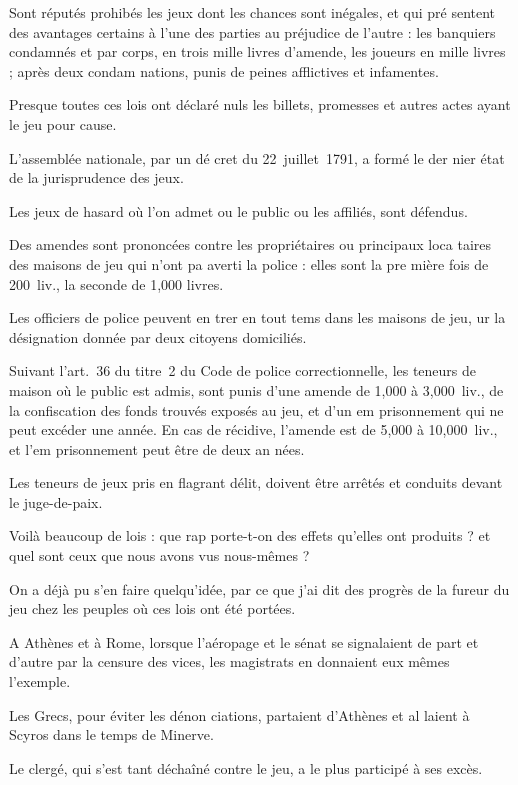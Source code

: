 Sont réputés prohibés les jeux dont
les chances sont inégales, et qui pré%
sentent des avantages certains à l'une
des parties au préjudice de l'autre : les
banquiers condamnés et par corps, en
trois mille livres d'amende, les joueurs
en mille livres ; après deux condam%
nations, punis de peines afflictives
et infamentes.

Presque toutes ces lois ont déclaré
nuls les billets, promesses et autres
actes ayant le jeu pour cause.

L'assemblée nationale, par un dé%
cret du 22~juillet~1791, a formé le der%
nier état de la jurisprudence des jeux.

Les jeux de hasard où l'on admet ou
le public ou les affiliés, sont défendus.

Des amendes sont prononcées contre
les propriétaires ou principaux loca%
taires des maisons de jeu qui n'ont
pa averti la police : elles sont la pre%
mière fois de 200~liv., la seconde de 
1,000 livres.

Les officiers de police peuvent en%
trer en tout tems dans les maisons de
jeu, ur la désignation donnée par
deux citoyens domiciliés.

Suivant l'art.~36 du titre~2 du Code
de police correctionnelle, les teneurs
de maison où le public est admis,
sont punis d'une amende de 1,000 à
3,000~liv., de la confiscation des fonds
trouvés exposés au jeu, et d'un em%
prisonnement qui ne peut excéder une
année. En cas de récidive, l'amende
est de 5,000 à 10,000~liv., et l'em%
prisonnement peut être de deux an%
nées.

Les teneurs de jeux pris en flagrant
délit, doivent être arrêtés et conduits
devant le juge-de-paix.

Voilà beaucoup de lois : que rap%
porte-t-on des effets qu'elles ont
produits ? et quel sont ceux que nous
avons vus nous-mêmes ?

On a déjà pu s'en faire quelqu'idée,
par ce que j'ai dit des progrès de la
fureur du jeu chez les peuples où ces
lois ont été portées.

A Athènes et à Rome, lorsque
l'aéropage et le sénat se signalaient
de part et d'autre par la censure des
vices, les magistrats en donnaient
eux mêmes l'exemple.

Les Grecs, pour éviter les dénon%
ciations, partaient d'Athènes et al%
laient à Scyros dans le temps de
Minerve.

Le clergé, qui s'est tant déchaîné
contre le jeu, a le plus participé à
ses excès.

